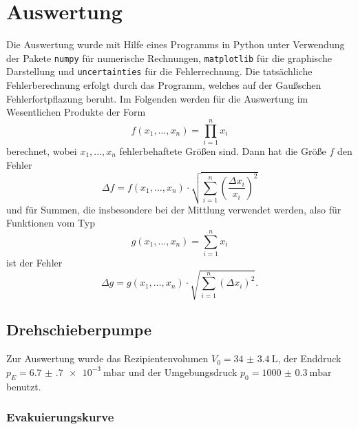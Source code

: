 \section{Auswertung}
\label{sec:Auswertung}

Die Auswertung wurde mit Hilfe eines Programms in Python unter Verwendung der Pakete \texttt{numpy}\cite{numpy} für numerische Rechnungen,
 \texttt{matplotlib}\cite{matplotlib} für die graphische Darstellung und \texttt{uncertainties}\cite{uncertainties} für die Fehlerrechnung.
Die tatsächliche Fehlerberechnung erfolgt durch das Programm, welches auf der Gaußschen Fehlerfortpflazung beruht.
Im Folgenden werden für die Auswertung im Wesentlichen Produkte der Form
\begin{equation*}
  f(x_1,\ldots,x_n) = \prod_{i=1}^n x_i
\end{equation*}
berechnet, wobei $x_1,\ldots,x_n$ fehlerbehaftete Größen sind.
Dann hat die Größe $f$ den Fehler
\begin{equation*}
  \Delta f = f(x_1,\ldots,x_n) \cdot \sqrt{\sum_{i=1}^n \left(\frac{\Delta x_i}{x_i}\right)^2}
\end{equation*}
und für Summen, die insbesondere bei der Mittlung verwendet werden, also für Funktionen vom Typ
\begin{equation*}
  g(x_1,\ldots,x_n) = \sum_{i=1}^n x_i
\end{equation*}
ist der Fehler
\begin{equation}
  \Delta g = g(x_1,\ldots,x_n) \cdot \sqrt{\sum_{i=1}^n \left(\Delta x_i\right)^2}.
  \label{eq:fehlerDesMittelwertes}
\end{equation}

\subsection{Drehschieberpumpe}
    Zur Auswertung wurde das Rezipientenvolumen $V_0 = \SI{34(3.4)}{\liter}$\cite{sample}, der Enddruck $p_E = \qty{6.7(7)e-3}{\milli\bar}$
    und der Umgebungsdruck $p_0 = \qty{1000(0.3)}{\milli\bar}$ benutzt.

    \subsubsection{Evakuierungskurve}

